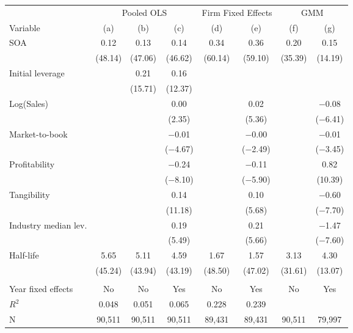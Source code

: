 \begin{tabular}{l*{7}{c}}
\toprule
 & \multicolumn{3}{c}{Pooled OLS} & \multicolumn{2}{c}{Firm Fixed Effects} & \multicolumn{2}{c}{GMM} \\ \cmidrule(lr){2-4} \cmidrule(lr){5-6} \cmidrule(lr){7-8}
Variable & (a) & (b) & (c) & (d) & (e) & (f) & (g) \\ \midrule
SOA         &        0.12&        0.13&        0.14&        0.34&        0.36&        0.20&        0.15\\
            &     (48.14)&     (47.06)&     (46.62)&     (60.14)&     (59.10)&     (35.39)&     (14.19)\\
\addlinespace
Initial leverage&            &        0.21&        0.16&            &            &            &            \\
            &            &     (15.71)&     (12.37)&            &            &            &            \\
\addlinespace
Log(Sales)  &            &            &        0.00&            &        0.02&            &     $-$0.08\\
            &            &            &      (2.35)&            &      (5.36)&            &   ($-$6.41)\\
\addlinespace
Market-to-book&            &            &     $-$0.01&            &     $-$0.00&            &     $-$0.01\\
            &            &            &   ($-$4.67)&            &   ($-$2.49)&            &   ($-$3.45)\\
\addlinespace
Profitability&            &            &     $-$0.24&            &     $-$0.11&            &        0.82\\
            &            &            &   ($-$8.10)&            &   ($-$5.90)&            &     (10.39)\\
\addlinespace
Tangibility &            &            &        0.14&            &        0.10&            &     $-$0.60\\
            &            &            &     (11.18)&            &      (5.68)&            &   ($-$7.70)\\
\addlinespace
Industry median lev.&            &            &        0.19&            &        0.21&            &     $-$1.47\\
            &            &            &      (5.49)&            &      (5.66)&            &   ($-$7.60)\\
\addlinespace
Half-life   &        5.65&        5.11&        4.59&        1.67&        1.57&        3.13&        4.30\\
            &     (45.24)&     (43.94)&     (43.19)&     (48.50)&     (47.02)&     (31.61)&     (13.07)\\
\\
Year fixed effects&          No&          No&         Yes&          No&         Yes&          No&         Yes\\
$ R^{2}$    &       0.048&       0.051&       0.065&       0.228&       0.239&            &            \\
N           &      90,511&      90,511&      90,511&      89,431&      89,431&      90,511&      79,997\\
\bottomrule
\end{tabular}
